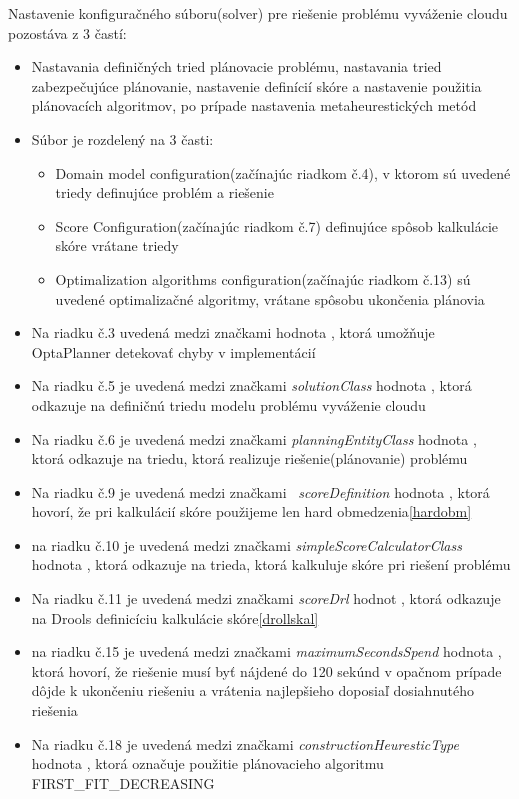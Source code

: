 \newpage
Nastavenie konfiguračného súboru(solver) pre riešenie problému vyváženie cloudu pozostáva z 3 častí: 
\begin{itemize}
\item Nastavania definičných tried plánovacie problému, nastavania tried zabezpečujúce plánovanie, nastavenie definícií skóre a nastavenie použitia plánovacích algoritmov, po prípade nastavenia metaheurestických metód
\item Súbor je rozdelený na 3 časti:
\begin{itemize}
\item Domain model configuration(začínajúc riadkom č.4), v ktorom sú uvedené triedy definujúce problém a riešenie
\item Score Configuration(začínajúc riadkom č.7) definujúce spôsob kalkulácie skóre vrátane triedy
\item Optimalization algorithms configuration(začínajúc riadkom č.13) sú uvedené optimalizačné algoritmy, vrátane spôsobu ukončenia plánovia
\end{itemize}
\item Na riadku č.3 uvedená medzi značkami  hodnota , ktorá umožňuje OptaPlanner detekovať chyby v implementácií
\item Na riadku č.5 je uvedená medzi značkami \emph{solutionClass} hodnota , ktorá odkazuje na definičnú triedu modelu problému vyváženie cloudu
\item Na riadku č.6 je uvedená medzi značkami \emph{planningEntityClass} hodnota , ktorá odkazuje na triedu, ktorá realizuje riešenie(plánovanie) problému
\item Na riadku č.9 je uvedená medzi značkami  \emph{scoreDefinition} hodnota , ktorá hovorí, že pri kalkulácií skóre použijeme len hard obmedzenia\ref{hardobm}
\item na riadku č.10 je uvedená medzi značkami \emph{simpleScoreCalculatorClass} hodnota , ktorá odkazuje na trieda, ktorá kalkuluje skóre pri riešení problému
\item Na riadku č.11 je uvedená medzi značkami \emph{scoreDrl} hodnot , ktorá odkazuje na Drools definicíciu kalkulácie skóre\ref{drollskal}
\item na riadku č.15 je uvedená medzi značkami \emph{maximumSecondsSpend} hodnota , ktorá hovorí, že riešenie musí byť nájdené do 120 sekúnd v opačnom prípade dôjde k ukončeniu riešeniu a vrátenia najlepšieho doposiaľ dosiahnutého riešenia
\item Na riadku č.18 je uvedená medzi značkami \emph{constructionHeuresticType} hodnota , ktorá označuje použitie plánovacieho algoritmu FIRST_FIT_DECREASING\cite{algibook}
\end{itemize}
